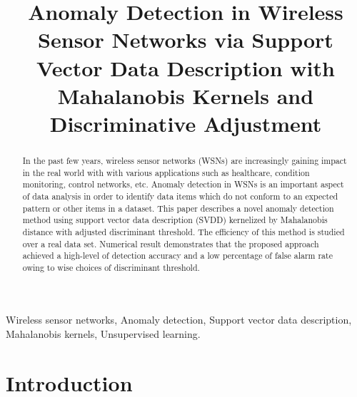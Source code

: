 \documentclass[conference]{IEEEtran}
\theoremstyle{problemstyle}
\begin{document}
\title{Anomaly Detection in Wireless Sensor Networks via Support Vector Data Description with Mahalanobis Kernels and Discriminative Adjustment}

\author{
\and
{}
}

\maketitle

\begin{abstract}

In the past few years, wireless sensor networks (WSNs) are increasingly gaining impact in the real world with with various applications such as healthcare, condition monitoring, control networks, etc. Anomaly detection in WSNs is an important aspect of data analysis in order to identify data items which do not conform to an expected pattern or other items in a dataset. This paper describes a novel anomaly detection method using support vector data description (SVDD) kernelized by Mahalanobis distance with adjusted discriminant threshold. The efficiency of this method is studied over a real data set. Numerical result demonstrates that the proposed approach  achieved a high-level of detection accuracy and a low percentage of false alarm rate owing to wise choices of discriminant threshold.
\end{abstract}

\begin{IEEEkeywords}
Wireless sensor networks, Anomaly detection, Support vector data description, Mahalanobis kernels, Unsupervised learning.
\end{IEEEkeywords}

\IEEEpeerreviewmaketitle

\section{Introduction}
\end{document}
